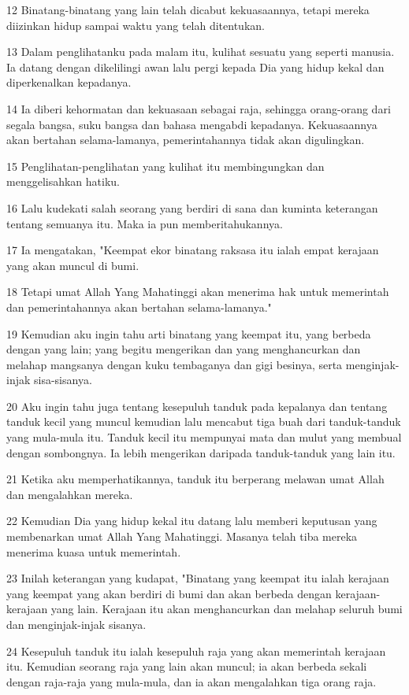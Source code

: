 \par 12 Binatang-binatang yang lain telah dicabut kekuasaannya, tetapi mereka diizinkan hidup sampai waktu yang telah ditentukan.
\par 13 Dalam penglihatanku pada malam itu, kulihat sesuatu yang seperti manusia. Ia datang dengan dikelilingi awan lalu pergi kepada Dia yang hidup kekal dan diperkenalkan kepadanya.
\par 14 Ia diberi kehormatan dan kekuasaan sebagai raja, sehingga orang-orang dari segala bangsa, suku bangsa dan bahasa mengabdi kepadanya. Kekuasaannya akan bertahan selama-lamanya, pemerintahannya tidak akan digulingkan.
\par 15 Penglihatan-penglihatan yang kulihat itu membingungkan dan menggelisahkan hatiku.
\par 16 Lalu kudekati salah seorang yang berdiri di sana dan kuminta keterangan tentang semuanya itu. Maka ia pun memberitahukannya.
\par 17 Ia mengatakan, "Keempat ekor binatang raksasa itu ialah empat kerajaan yang akan muncul di bumi.
\par 18 Tetapi umat Allah Yang Mahatinggi akan menerima hak untuk memerintah dan pemerintahannya akan bertahan selama-lamanya."
\par 19 Kemudian aku ingin tahu arti binatang yang keempat itu, yang berbeda dengan yang lain; yang begitu mengerikan dan yang menghancurkan dan melahap mangsanya dengan kuku tembaganya dan gigi besinya, serta menginjak-injak sisa-sisanya.
\par 20 Aku ingin tahu juga tentang kesepuluh tanduk pada kepalanya dan tentang tanduk kecil yang muncul kemudian lalu mencabut tiga buah dari tanduk-tanduk yang mula-mula itu. Tanduk kecil itu mempunyai mata dan mulut yang membual dengan sombongnya. Ia lebih mengerikan daripada tanduk-tanduk yang lain itu.
\par 21 Ketika aku memperhatikannya, tanduk itu berperang melawan umat Allah dan mengalahkan mereka.
\par 22 Kemudian Dia yang hidup kekal itu datang lalu memberi keputusan yang membenarkan umat Allah Yang Mahatinggi. Masanya telah tiba mereka menerima kuasa untuk memerintah.
\par 23 Inilah keterangan yang kudapat, "Binatang yang keempat itu ialah kerajaan yang keempat yang akan berdiri di bumi dan akan berbeda dengan kerajaan-kerajaan yang lain. Kerajaan itu akan menghancurkan dan melahap seluruh bumi dan menginjak-injak sisanya.
\par 24 Kesepuluh tanduk itu ialah kesepuluh raja yang akan memerintah kerajaan itu. Kemudian seorang raja yang lain akan muncul; ia akan berbeda sekali dengan raja-raja yang mula-mula, dan ia akan mengalahkan tiga orang raja.
